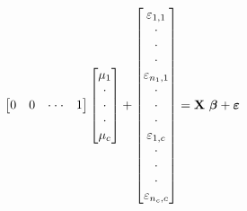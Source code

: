 \begin{frame}[shrink=2]
\begin{itemize}
\begin{equation*}
\begin{bmatrix}
0 & 0 & \cdot \cdot \cdot  & 1%
\end{bmatrix}%
\begin{bmatrix}
\mu _{1} \\
\cdot  \\
\cdot  \\
\cdot  \\
\mu _{c}%
\end{bmatrix}%
+%
\begin{bmatrix}
\varepsilon_{1,1} \\
\cdot  \\
\cdot  \\
\cdot  \\
\varepsilon_{n_{1},1} \\
\cdot  \\
\cdot  \\
\cdot  \\
\varepsilon_{1,c} \\
\cdot  \\
\cdot  \\
\cdot  \\
\varepsilon_{n_{c},c}%
\end{bmatrix}%
=\mathbf{X\ \boldsymbol \beta + \boldsymbol \varepsilon} \text{\ \ \
\ }
\end{equation*}
             \end{itemize}
    \end{frame}


